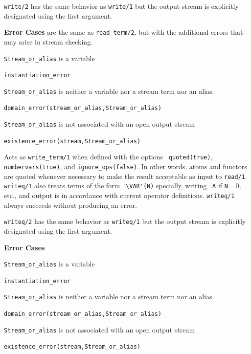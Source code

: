 \begin{description}
	{\tt write/2} has the same behavior as {\tt write/1} but the
	output stream is explicitly designated using the first argument.

{\bf Error Cases} are the same as {\tt read\_term/2}, but with the
additional errors that may arise in stream checking.
\bi
\item 	{\tt Stream\_or\_alias} is a variable
\bi
\item {\tt instantiation\_error}
\ei
\item 	{\tt Stream\_or\_alias} is neither a variable nor a stream term nor an alias.
\bi
\item 	{\tt domain\_error(stream\_or\_alias,Stream\_or\_alias)}
\ei
\item 	{\tt Stream\_or\_alias} is not associated with an open output stream
\bi
\item 	{\tt existence\_error(stream,Stream\_or\_alias)}
\ei
\ei

%
Acts as {\tt write\_term/1} when defined with the options {\tt
  quoted(true)}, {\tt numbervars(true)}, and {\tt ignore\_ops(false)}.
In other words, atoms and functors are quoted whenever necessary to
make the result acceptable as input to {\tt read/1} {\tt writeq/1}
also treats terms of the form \verb|'\VAR'(N)| specially, writing {\tt
  A} if {\tt N}= 0, etc., and output is in accordance with current
operator definitions.  {\tt writeq/1} always succeeds without
producing an error.

%
	{\tt writeq/2} has the same behavior as {\tt writeq/1} but the
	output stream is explicitly designated using the first argument.

{\bf Error Cases} 
\bi
\item 	{\tt Stream\_or\_alias} is a variable
\bi
\item {\tt instantiation\_error}
\ei
\item 	{\tt Stream\_or\_alias} is neither a variable nor a stream term nor an alias.
\bi
\item 	{\tt domain\_error(stream\_or\_alias,Stream\_or\_alias)}
\ei
\item 	{\tt Stream\_or\_alias} is not associated with an open output stream
\bi
\item 	{\tt existence\_error(stream,Stream\_or\_alias)}
\ei
\ei


\end{description}
